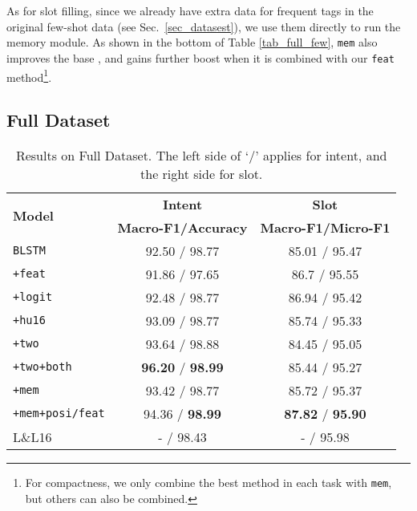 As for slot filling, since we already have extra data for frequent tags in the original few-shot data (see Sec.~\ref{sec_datasest}), we use
them directly to run the memory module. As shown in the bottom of Table \ref{tab_full_few}, \texttt{mem} also improves the base \BLSTM, and
gains further boost when it is combined with our \texttt{feat} method\footnote{For compactness, we only combine the best method in each
task with \texttt{mem}, but others can also be combined.}.



\subsection{Full Dataset}

\begin{table}
\setlength{\tabcolsep}{0.23em}
\centering
\small{
\begin{tabular}{|l|c|c|}

\hline
\multirow{2}{*}{\textbf{Model}} & \textbf{Intent} & \textbf{Slot} \\
\cline{2-3}
  & \textbf{\scriptsize Macro-F1/Accuracy} &  \textbf{\scriptsize Macro-F1/Micro-F1} \\
\hline
\rowcolor{Gray} \texttt{BLSTM} & 92.50 / 98.77  & 85.01 / 95.47\\
\hline
\texttt{+feat} & 91.86 / 97.65 & 86.7 / 95.55\\
\hline
\rowcolor{Gray} \texttt{+logit} & 92.48 / 98.77 & 86.94 / 95.42  \\
\hline
\texttt{+hu16} & 93.09 / 98.77 & 85.74 / 95.33  \\
\hline
\rowcolor{Gray} \texttt{+two} & 93.64 / 98.88  & 84.45 / 95.05\\
\hline
\texttt{+two+both }& \textbf{96.20} / \textbf{98.99} & 85.44 / 95.27 \\
\hline
\rowcolor{Gray} \texttt{+mem} & 93.42 / 98.77 & 85.72 / 95.37\\
\hline
\texttt{+mem+posi/feat} & 94.36 / \textbf{98.99} & \textbf{87.82} / \textbf{95.90} \\
\hline
\hline
\rowcolor{Gray} L\&L16 & - / 98.43 & - / 95.98\\
\hline

\end{tabular}
}
\caption{Results on Full Dataset. The left side of `$/$' applies for intent, and the right side for slot.}
\label{tab_full}
\vspace{-1em}
\end{table}

